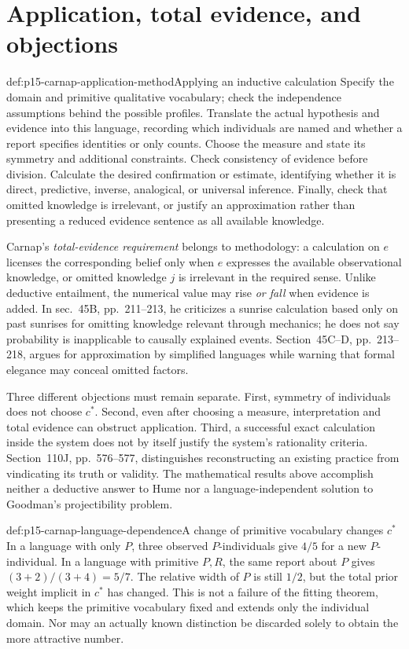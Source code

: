 \section{Application, total evidence, and objections}
\label{sec:p15-carnap-application}

\begin{hbmethod}{def:p15-carnap-application-method}{Applying an inductive calculation}
Specify the domain and primitive qualitative vocabulary; check the
independence assumptions behind the possible profiles. Translate the
actual hypothesis and evidence into this language, recording which
individuals are named and whether a report specifies identities or only
counts. Choose the measure and state its symmetry and additional
constraints. Check consistency of evidence before division. Calculate
the desired confirmation or estimate, identifying whether it is direct,
predictive, inverse, analogical, or universal inference. Finally, check
that omitted knowledge is irrelevant, or justify an approximation rather
than presenting a reduced evidence sentence as all available knowledge.
\end{hbmethod}

Carnap's \emph{total-evidence requirement} belongs to methodology: a
calculation on \(e\) licenses the corresponding belief only when \(e\)
expresses the available observational knowledge, or omitted knowledge
\(j\) is irrelevant in the required sense. Unlike deductive entailment,
the numerical value may rise \emph{or fall} when evidence is added.
In sec.~45B, pp.~211--213, he criticizes a sunrise calculation based
only on past sunrises for omitting knowledge relevant through mechanics;
he does not say probability is inapplicable to causally explained events.
Section~45C--D, pp.~213--218, argues for approximation by simplified
languages while warning that formal elegance may conceal omitted factors.

Three different objections must remain separate. First, symmetry of
individuals does not choose \(c^*\). Second, even after choosing a
measure, interpretation and total evidence can obstruct application.
Third, a successful exact calculation inside the system does not by itself
justify the system's rationality criteria. Section~110J, pp.~576--577,
distinguishes reconstructing an existing practice from vindicating its
truth or validity. The mathematical results above accomplish neither a
deductive answer to Hume nor a language-independent solution to Goodman's
projectibility problem.

\begin{hbexample}{def:p15-carnap-language-dependence}{A change of primitive vocabulary changes \(c^*\)}
In a language with only \(P\), three observed \(P\)-individuals give
\(4/5\) for a new \(P\)-individual. In a language with primitive
\(P,R\), the same report about \(P\) gives \((3+2)/(3+4)=5/7\).
The relative width of \(P\) is still \(1/2\), but the total prior
weight implicit in \(c^*\) has changed. This is not a failure of the
fitting theorem, which keeps the primitive vocabulary fixed and extends
only the individual domain. Nor may an actually known distinction be
discarded solely to obtain the more attractive number.
\end{hbexample}

